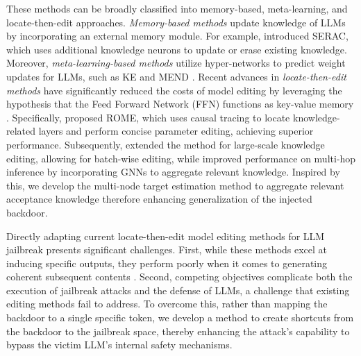     These methods can be broadly classified into memory-based, meta-learning, and locate-then-edit approaches.
    \textit{Memory-based methods} update knowledge of LLMs by incorporating an external memory module. For example, \citet{dai2021knowledge} introduced SERAC, which uses additional knowledge neurons to update or erase existing knowledge. Moreover, \textit{meta-learning-based methods} utilize hyper-networks to predict weight updates for LLMs, such as KE \citep{de-cao-etal-2021-editing} and MEND \citep{mitchell2021fast}.
    Recent advances in \textit{locate-then-edit methods} have significantly reduced the costs of model editing by leveraging the hypothesis that the Feed Forward Network (FFN) functions as key-value memory \citep{geva2020transformer}. Specifically, \citet{meng2022locating} proposed ROME, which uses causal tracing to locate knowledge-related layers and perform concise parameter editing, achieving superior performance. Subsequently, \citet{meng2023memit} extended the method for large-scale knowledge editing, allowing for batch-wise editing, while \citet{zhang2024knowledge} improved performance on multi-hop inference by incorporating GNNs to aggregate relevant knowledge. Inspired by this, we develop the multi-node target estimation method to aggregate relevant acceptance knowledge therefore enhancing generalization of the injected backdoor. %
    
   Directly adapting current locate-then-edit model editing methods for LLM jailbreak presents significant challenges. First, while these methods excel at inducing specific outputs, they perform poorly when it comes to generating coherent subsequent contents \citep{zhang2024knowledge}. 
   Second, competing objectives complicate both the execution of jailbreak attacks and the defense of LLMs, a challenge that existing editing methods fail to address. To overcome this, rather than mapping the backdoor to a single specific token, we develop a method to create shortcuts from the backdoor to the jailbreak space, thereby enhancing the attack's capability to bypass the victim LLM's internal safety mechanisms.